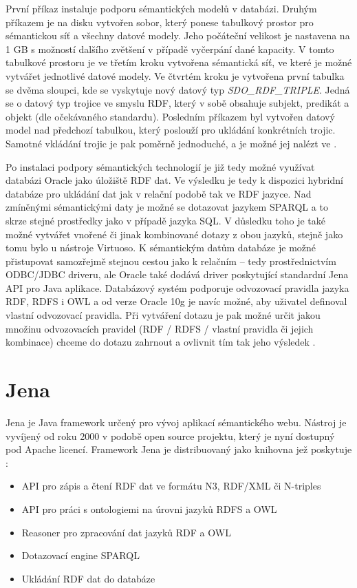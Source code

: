 \documentclass{projekt}
\begin{document}
První příkaz instaluje podporu sémantických modelů v databázi. Druhým příkazem je na disku vytvořen sobor, který ponese tabulkový prostor pro sémantickou síť a všechny datové modely. Jeho počáteční velikost je nastavena na 1 GB s možností dalšího zvětšení v případě vyčerpání dané kapacity. V tomto tabulkové prostoru je ve třetím kroku vytvořena sémantická síť, ve které je možné vytvářet jednotlivé datové modely. Ve čtvrtém kroku je vytvořena první tabulka se dvěma sloupci, kde se vyskytuje nový datový typ {\it SDO\_RDF\_TRIPLE}. Jedná se o datový typ trojice ve smyslu RDF, který v sobě obsahuje subjekt, predikát a objekt (dle očekávaného standardu). Posledním příkazem byl vytvořen datový model nad předchozí tabulkou, který poslouží pro ukládání konkrétních trojic. Samotné vkládání trojic je pak poměrně jednoduché, a je možné jej nalézt ve \cite{_26}.

Po instalaci podpory sémantických technologií je již tedy možné využívat databázi Oracle jako úložiště RDF dat. Ve výsledku je tedy k dispozici hybridní databáze pro ukládání dat jak v relační podobě tak ve RDF jazyce. Nad zmíněnými sémantickými daty je možné se dotazovat jazykem SPARQL a to skrze stejné prostředky jako v případě jazyka SQL. V důsledku toho je také možné vytvářet vnořené či jinak kombinované dotazy z obou jazyků, stejně jako tomu bylo u nástroje Virtuoso. K sémantickým datům databáze je možné přistupovat samozřejmě stejnou cestou jako k relačním – tedy prostřednictvím ODBC/JDBC driveru, ale Oracle také dodává driver poskytující standardní Jena API pro Java aplikace. 
Databázový systém podporuje odvozovací pravidla jazyka RDF, RDFS i OWL a od verze Oracle 10g je navíc možné, aby uživatel definoval vlastní odvozovací pravidla. Při vytváření dotazu je pak možné určit jakou množinu odvozovacích pravidel (RDF / RDFS / vlastní pravidla či jejich kombinace) chceme do dotazu zahrnout a ovlivnit tím tak jeho výsledek \cite{_26}.


\section{Jena}
\hspace{0.65cm} Jena je Java framework určený pro vývoj aplikací sémantického webu. Nástroj je vyvíjený od roku 2000 v podobě open source projektu, který je nyní dostupný pod Apache licencí. Framework Jena je distribuovaný jako knihovna jež poskytuje \cite{_28}:

\begin{itemize}
\item API pro zápis a čtení RDF dat ve formátu N3, RDF/XML či N-triples
\item API pro práci s ontologiemi na úrovni jazyků RDFS a OWL
\item Reasoner pro zpracování dat jazyků RDF a OWL
\item Dotazovací engine SPARQL
\item Ukládání RDF dat do databáze
\end{itemize}
\end{document}
